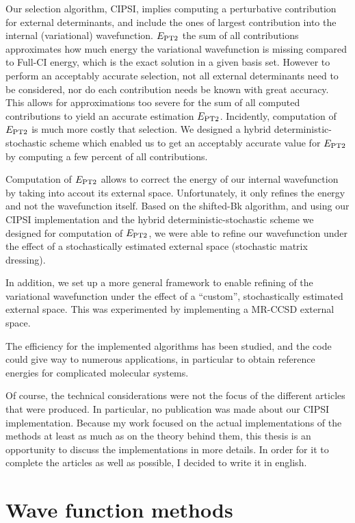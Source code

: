 \documentclass[12pt,a4paper]{report}
\begin{document}
Our selection algorithm, CIPSI, implies computing a perturbative contribution for external determinants, and include the ones of largest contribution into the internal (variational) wavefunction. $E_\text{PT2}$ the sum of all contributions approximates how much energy the variational wavefunction is missing compared to Full-CI energy, which is the exact solution in a given basis set. However to perform an acceptably accurate selection, not all external determinants need to be considered, nor do each contribution needs be known with great accuracy. This allows for approximations too severe for the sum of all computed contributions to yield an accurate estimation $E_\text{PT2}$. Incidently, computation of $E_\text{PT2}$ is much more costly that selection. We designed a hybrid deterministic-stochastic scheme which enabled us to get an acceptably accurate value for $E_\text{PT2}$ by computing a few percent of all contributions.

Computation of $E_\text{PT2}$ allows to correct the energy of our internal wavefunction by taking into accout its external space. Unfortunately, it only refines the energy and not the wavefunction itself. Based on the shifted-Bk algorithm, and using our CIPSI implementation and the hybrid deterministic-stochastic scheme we designed for computation of $E_\text{PT2}$, we were able to refine our wavefunction under the effect of a stochastically estimated external space (stochastic matrix dressing).

In addition, we set up a more general framework to enable refining of the variational wavefunction under the effect of a ``custom'', stochastically estimated external space. This was experimented by implementing a MR-CCSD external space.


The efficiency for the implemented algorithms has been studied, and the code could give way to numerous applications, in particular to obtain reference energies for complicated molecular systems.

Of course, the technical considerations were not the focus of the different articles that were produced. In particular, no publication was made about our CIPSI implementation. Because my work focused on the actual implementations of the methods at least as much as on the theory behind them, this thesis is an opportunity to discuss the implementations in more details. In order for it to complete the articles as well as possible, I decided to write it in english.



\chapter{Wave function methods}
\minitoc

\end{document}
